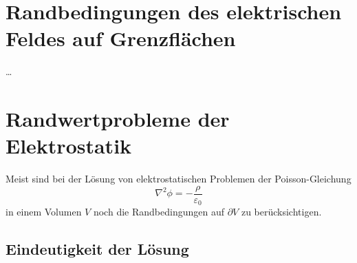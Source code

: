 \section{Randbedingungen des elektrischen Feldes auf Grenzflächen\label{mark-3.4}}

 {\ldots}

\section{Randwertprobleme der Elektrostatik\label{ref-028}}

Meist sind bei der Lösung von elektrostatischen Problemen der Poisson-Gleichung
\begin{equation*}
	\nabla ^{2}\phi =-\frac{\rho }{\varepsilon _{0}}
\end{equation*}
in einem Volumen $V$ noch die Randbedingungen auf $\partial V$ zu berücksichtigen.

\subsection{Eindeutigkeit der Lösung\label{ref-029}}

